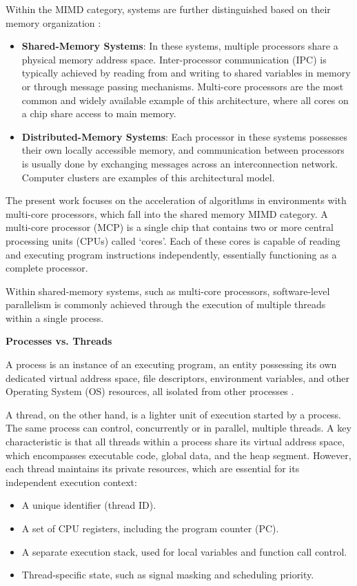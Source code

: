 Within the MIMD category, systems are further distinguished based on their memory organization \cite{Pacheco2011}:
\begin{itemize}
    \item \textbf{Shared-Memory Systems}: In these systems, multiple processors share a physical memory address space. Inter-processor communication (IPC) is typically achieved by reading from and writing to shared variables in memory or through message passing mechanisms. Multi-core processors are the most common and widely available example of this architecture, where all cores on a chip share access to main memory.
    \item \textbf{Distributed-Memory Systems}: Each processor in these systems possesses their own locally accessible memory, and communication between processors is usually done by exchanging messages across an interconnection network. Computer clusters are examples of this architectural model.
\end{itemize}

The present work focuses on the acceleration of algorithms in environments with multi-core processors, which fall into the shared memory MIMD category. A multi-core processor (MCP) is a single chip that contains two or more central processing units (CPUs) called ‘cores’. Each of these cores is capable of reading and executing program instructions independently, essentially functioning as a complete processor.


Within shared-memory systems, such as multi-core processors, software-level parallelism is commonly achieved through the execution of multiple threads within a single process.

\textbf{Processes vs. Threads}

A process is an instance of an executing program, an entity possessing its own dedicated virtual address space, file descriptors, environment variables, and other Operating System (OS) resources, all isolated from other processes \cite{Pacheco2011}.

A thread, on the other hand, is a lighter unit of execution started by a process. The same process can control, concurrently or in parallel, multiple threads. A key characteristic is that all threads within a process share its virtual address space, which encompasses executable code, global data, and the heap segment. However, each thread maintains its private resources, which are essential for its independent execution context:
\begin{itemize}
    \item A unique identifier (thread ID).
    \item A set of CPU registers, including the program counter (PC).
    \item A separate execution stack, used for local variables and function call control.
    \item Thread-specific state, such as signal masking and scheduling priority.
\end{itemize}

